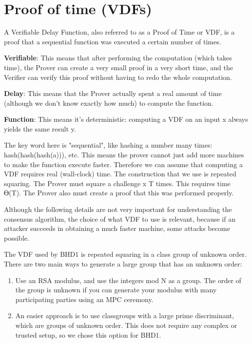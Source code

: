 \section{Proof of time (VDFs)}
\begin{flushleft}
    A Verifiable Delay Function, also referred to as a Proof of Time or VDF, is a proof that a sequential function was executed a certain number of times.
\end{flushleft}
\begin{flushleft}
    \textbf{Verifiable}: This means that after performing the computation (which takes time), the Prover can create a very small proof in a very short time, and the Verifier can verify this proof without having to redo the whole computation.
\end{flushleft}
\begin{flushleft}
    \textbf{Delay}: This means that the Prover actually spent a real amount of time (although we don’t know exactly how much) to compute the function.
\end{flushleft}
\begin{flushleft}
    \textbf{Function}: This means it’s deterministic: computing a VDF on an input x always yields the same result y.
\end{flushleft}
\begin{flushleft}
    The key word here is "sequential", like hashing a number many times: hash(hash(hash(a))), etc. This means the prover cannot just add more machines to make the function execute faster. Therefore we can assume that computing a VDF requires real (wall-clock) time. The construction that we use is repeated squaring. The Prover must square a challenge x T times. This requires time ϴ(T). The Prover also must create a proof that this was performed properly.
\end{flushleft}
\begin{flushleft}
    Although the following details are not very important for understanding the consensus algorithm, the choice of what VDF to use is relevant, because if an attacker succeeds in obtaining a much faster machine, some attacks become possible.
\end{flushleft}

\begin{flushleft}
    The VDF used by BHD1 is repeated squaring in a class group of unknown order. There are two main ways to generate a large group that has an unknown order:
\end{flushleft}
\begin{enumerate}
    \item Use an RSA modulus, and use the integers mod N as a group. The order of the group is unknown if you can generate your modulus with many participating parties using an MPC ceremony.
    \item An easier approach is to use classgroups with a large prime discriminant, which are groups of unknown order. This does not require any complex or trusted setup, so we chose this option for BHD1.
\end{enumerate}
